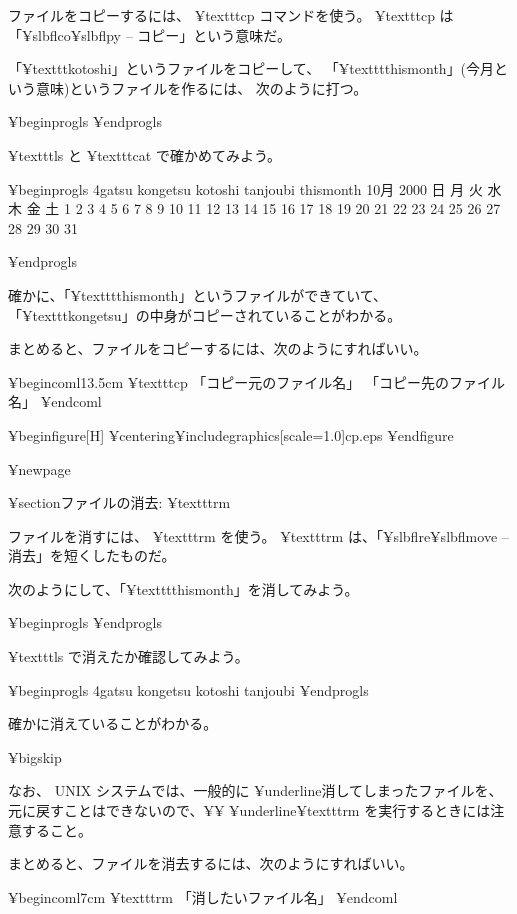 ファイルをコピーするには、 ¥texttt{cp} コマンドを使う。
 ¥texttt{cp} は「¥slbfl{c}o¥slbfl{p}y -- コピー」という意味だ。

「¥texttt{kotoshi}」というファイルをコピーして、
「¥texttt{thismonth}」(今月という意味)というファイルを作るには、
次のように打つ。

¥begin{progls}
%
¥end{progls}

¥texttt{ls} と ¥texttt{cat} で確かめてみよう。

¥begin{progls}
4gatsu          kongetsu        kotoshi         tanjoubi        thismonth
     10月 2000
日 月 火 水 木 金 土
 1  2  3  4  5  6  7
 8  9 10 11 12 13 14
15 16 17 18 19 20 21
22 23 24 25 26 27 28
29 30 31

%
¥end{progls}

確かに、「¥texttt{thismonth}」というファイルができていて、
「¥texttt{kongetsu}」の中身がコピーされていることがわかる。

まとめると、ファイルをコピーするには、次のようにすればいい。

¥begin{coml}{13.5cm}
¥texttt{cp} 「コピー元のファイル名」 「コピー先のファイル名」
¥end{coml}

¥begin{figure}[H]
¥centering{¥includegraphics[scale=1.0]{cp.eps}}
¥end{figure}

¥newpage

¥section{ファイルの消去: ¥texttt{rm}}

ファイルを消すには、 ¥texttt{rm} を使う。
¥texttt{rm} は、「¥slbfl{r}e¥slbfl{m}ove -- 消去」を短くしたものだ。

次のようにして、「¥texttt{thismonth}」を消してみよう。

¥begin{progls}
%
¥end{progls}

¥texttt{ls} で消えたか確認してみよう。

¥begin{progls}
4gatsu          kongetsu        kotoshi         tanjoubi
%
¥end{progls}

確かに消えていることがわかる。

¥bigskip

なお、 UNIX システムでは、一般的に
¥underline{消してしまったファイルを、
元に戻すことはできないので、}¥¥
¥underline{¥texttt{rm} を実行するときには注意すること。}

まとめると、ファイルを消去するには、次のようにすればいい。

¥begin{coml}{7cm}
¥texttt{rm} 「消したいファイル名」
¥end{coml}

